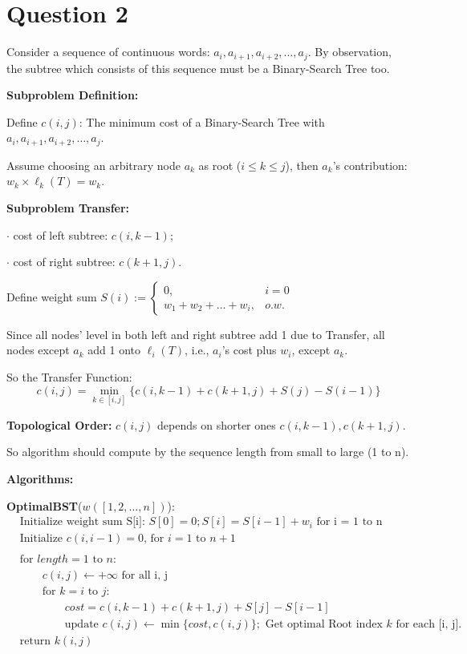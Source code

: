 \documentclass[11pt]{article}
\begin{document}
\qquad 

\qquad 

\qquad 

\section*{Question 2}
Consider a sequence of continuous words: $a_i, a_{i+1}, a_{i+2}, \dots, a_j$. 
By observation, the subtree which consists of this sequence must be a Binary-Search Tree too. 

\textbf{Subproblem Definition: }

\qquad Define $c(i, j)$: The minimum cost of a Binary-Search Tree with {$a_i, a_{i+1}, a_{i+2}, \dots, a_j$}.

\qquad Assume choosing an arbitrary node $a_k$ as root ($i \le k \le j$), then $a_k$'s contribution: $w_k \times \ell_k(T) = w_k$.

\textbf{Subproblem Transfer: }

\qquad $\cdot $ cost of left subtree: $c(i, k-1)$; 

\qquad $\cdot$ cost of right subtree: $c(k+1, j)$.

\qquad Define weight sum $S(i):= 
\begin{cases}
    0, & i = 0 \\
    w_1 + w_2 + \dots + w_i, & o.w. 
\end{cases}$

\qquad Since all nodes' level in both left and right subtree add 1 due to Transfer, 
all nodes except $a_k$ add 1 onto $\ell_i(T)$, i.e., $a_i$'s cost plus $w_i$, except $a_k$. 

\qquad So the Transfer Function: 
\[c(i, j) = \min_{k \in [i,j]}\{c(i, k-1) + c(k+1, j) + S(j) - S(i-1)\}\]

\textbf{Topological Order: } $c(i, j)$ depends on shorter ones $c(i, k-1), c(k+1, j)$. 

\qquad So algorithm should compute by the sequence length from small to large (1 to n). 

\textbf{Algorithms: }

\textbf{OptimalBST}($w([1,2,\dots,n])$): 
\begin{align*}
    & \text{Initialize weight sum S[i]: } S[0]=0; S[i]=S[i-1]+w_i \text{ for i = 1 to n } \\ 
    & \text{Initialize }c(i, i-1)=0 \text{, for } i=1 \text{ to } n+1 \\ 
    &  \\
    & \text{for } length = 1 \text{ to } n: \\
    & \qquad c(i, j) \gets +\infty \text{ for all i, j} \\
    & \qquad \text{for } k=i \text{ to } j:  \\
    & \qquad \qquad cost = c(i, k-1) + c(k+1, j) + S[j] - S[i-1] \\
    & \qquad \qquad \text{update } c(i, j) \gets \min \{cost, c(i, j)\}; \text{ Get optimal Root index } k \text{ for each [i, j]. } \\
    & \text{return } k(i, j) 
\end{align*}
\end{document}
